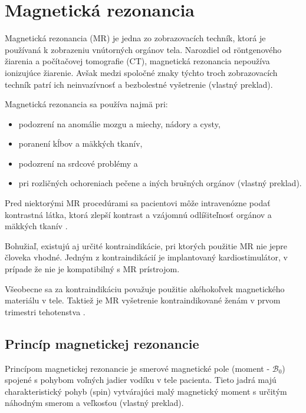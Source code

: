 \chapter {Magnetická rezonancia}
Magnetická rezonancia (MR) je jedna zo zobrazovacích techník, ktorá je používaná k zobrazeniu vnútorných orgánov tela.
Narozdiel od röntgenového žiarenia a počítačovej tomografie (CT), magnetická rezonancia nepoužíva ionizujúce žiarenie. Avšak medzi spoločné znaky týchto troch zobrazovacích techník patrí ich neinvazívnosť a bezbolestné vyšetrenie \cite{basic_principles_of_mri} (vlastný preklad).

Magnetická rezonancia sa používa najmä pri:
\begin {itemize}
\item {podozrení na anomálie mozgu a miechy, nádory a cysty,}
\item {poranení kĺbov a mäkkých tkanív,}
\item {podozrení na srdcové problémy a}
\item {pri rozličných ochoreniach pečene a iných brušných orgánov \cite{mr_usage} (vlastný preklad).}
\end {itemize}

Pred niektorými MR procedúrami sa pacientovi môže intravenózne podať kontrastná látka, ktorá zlepší kontrast a vzájomnú odlíšiteľnosť orgánov \newline a mäkkých tkanív \cite{contrast_agents}.

Bohužiaľ, existujú aj určité kontraindikácie, pri ktorých použitie MR nie je\newline pre človeka vhodné.
Jedným z kontraindikácií je implantovaný kardiostimulátor, v prípade že nie je kompatibilný s MR prístrojom.
\clearpage

Všeobecne sa za kontraindikáciu považuje použitie akéhokoľvek magnetického materiálu v tele. Taktiež je MR vyšetrenie kontraindikované ženám v prvom trimestri tehotenstva \cite{mr_contraindications}.

\section {Princíp magnetickej rezonancie}
Princípom magnetickej rezonancie je smerové magnetické pole (moment - $\mathcal{B}_{0}$) spojené s pohybom voľných jadier vodíku v tele pacienta. Tieto jadrá majú charakteristický pohyb (spin) vytvárajúci malý magnetický moment s určitým náhodným smerom a veľkosťou  \cite{basic_principles_of_mri} (vlastný preklad).

